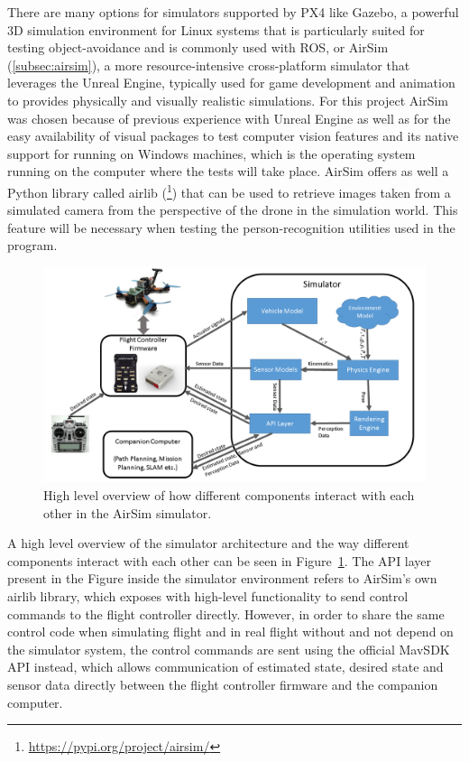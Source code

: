 There are many options for simulators supported by PX4 like Gazebo, a powerful 3D simulation environment for Linux systems that is particularly suited for testing object-avoidance and is commonly used with ROS, or AirSim (\ref{subsec:airsim}), a more resource-intensive cross-platform simulator that leverages the Unreal Engine, typically used for game development and animation to provides physically and visually realistic simulations.
For this project AirSim was chosen because of previous experience with Unreal Engine as well as for the easy availability of visual packages to test computer vision features and its native support for running on Windows machines, which is the operating system running on the computer where the tests will take place.
AirSim offers as well a Python library called airlib (\footnote{\url{https://pypi.org/project/airsim/}}) that can be used to retrieve images taken from a simulated camera from the perspective of the drone in the simulation world.
This feature will be necessary when testing the person-recognition utilities used in the program.
\begin{figure}
  \centering
  \includegraphics[width=\textwidth,keepaspectratio]{img/airsim-overview.png}
  \caption{High level overview of how different components interact with each other in the AirSim simulator.}\label{fig:airsim-overview}
\end{figure}
A high level overview of the simulator architecture and the way different components interact with each other can be seen in Figure~\ref{fig:airsim-overview}. 
The API layer present in the Figure inside the simulator environment refers to AirSim's own airlib library, which exposes with high-level functionality to send control commands to the flight controller directly.
However, in order to share the same control code when simulating flight and in real flight without and not depend on the simulator system, the control commands are sent using the official MavSDK API instead, which allows communication of estimated state, desired state and sensor data directly between the flight controller firmware and the companion computer.

